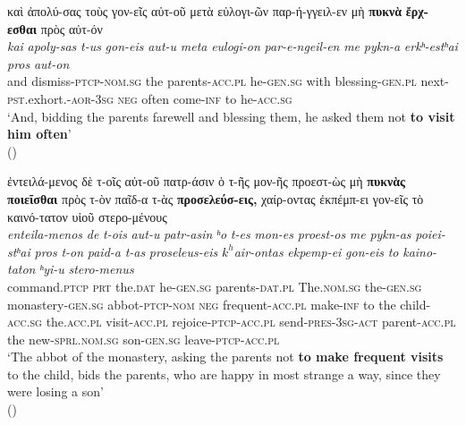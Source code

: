 \documentclass[output=paper,colorlinks,citecolor=brown]{langscibook}
\begin{document}

\ea\label{ex:vc:1}

\ea\label{ex:vc:1a}

\glll καὶ ἀπολύ-σας τοὺς γον-εῖς αὐτ-οῦ μετὰ εὐλογι-ῶν παρ-ή-γγειλ-εν μὴ \textbf{πυκνὰ} \textbf{ἔρχ-εσθαι} πρὸς αὐτ-όν\\
 \textit{kai} \textit{apoly-sas} \textit{t-us} \textit{gon-eis} \textit{aut-u} \textit{meta} \textit{eulogi-on} \textit{par-e-ngeil-en} \textit{me} \textit{pykn-a} \textit{erkʰ-estʰai} \textit{pros} \textit{aut-on}\\
and dismiss\textsc{-ptcp-nom.sg} the parents-\textsc{acc.pl} he-\textsc{gen.sg} with blessing-\textsc{gen.pl} next\textsc{-pst}.exhort.\textsc{-aor}-3\textsc{sg} \textsc{neg} often come-\textsc{inf} to he-\textsc{acc.sg}\\
\glt `And, bidding the parents farewell and blessing them, he asked them not \textbf{to visit him often}' \\
\hspace*{\fill}()

\ex\label{ex:vc:1b}

\glll ἐντειλά-μενος δὲ τ-οῖς αὐτ-οῦ πατρ-άσιν ὁ τ-ῆς μον-ῆς προεστ-ὼς μὴ \textbf{πυκνὰς}
\textbf{ποιεῖσθαι} πρὸς τ-ὸν παῖδ-α τ-ὰς \textbf{προσελεύσ-εις,} χαίρ-οντας ἐκπέμπ-ει γον-εῖς τὸ καινό-τατον υἱοῦ στερο-μένους\\
 \textit{enteila-menos} \textit{de} \textit{t-ois} \textit{aut-u} \textit{patr-asin} \textit{ʰo} \textit{t-es} \textit{mon-es} \textit{proest-os} \textit{me} \textit{pykn-as} \textit{poiei-stʰai} \textit{pros} \textit{t-on} \textit{paid-a} \textit{t-as} \textit{proseleus-eis} \textit{$k^h$air-ontas}
\textit{ekpemp-ei} \textit{gon-eis} \textit{to} \textit{kaino-taton} \textit{ʰyi-u} \textit{stero-menus}\\
command.\textsc{ptcp} \textsc{prt} the.\textsc{dat} he-\textsc{gen.sg} parents-\textsc{dat.pl} The.\textsc{nom.sg} the-\textsc{gen.sg} monastery-\textsc{gen.sg} abbot\textsc{-ptcp-nom} \textsc{neg} frequent-\textsc{acc.pl} make-\textsc{inf} to the child-\textsc{acc.sg} the.\textsc{acc.pl} visit-\textsc{acc.pl} rejoice-\textsc{ptcp-acc.pl} send-\textsc{pres-3sg-act} parent-\textsc{acc.pl} the new-\textsc{sprl.nom.sg}
son-\textsc{gen.sg} leave-\textsc{ptcp-acc.pl}\\
\glt `The abbot of the monastery, asking the parents not \textbf{to make frequent visits} to the child, bids the parents, who are happy in most strange a way, since they were losing a son' \\
\hspace*{\fill}() \\
\end{document}
